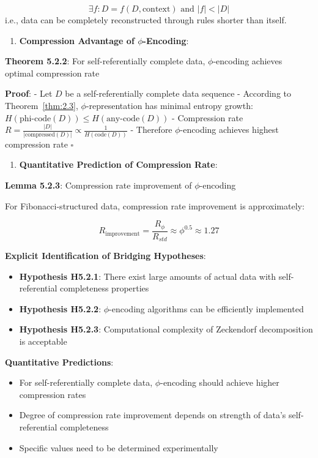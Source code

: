 \begin{equation}
\exists f: D = f(D, \text{context}) \text{ and } |f| < |D|
\end{equation}
   i.e., data can be completely reconstructed through rules shorter than itself.

\begin{enumerate}
\item \textbf{Compression Advantage of $\phi$-Encoding}:
\end{enumerate}
   \textbf{Theorem 5.2.2}: For self-referentially complete data, $\phi$-encoding achieves optimal compression rate
\label{thm:5.2.2}
   
   \textbf{Proof}:
   - Let $D$ be a self-referentially complete data sequence
   - According to Theorem~\ref{thm:2.3}, $\phi$-representation has minimal entropy growth: $H(\text{phi-code}(D)) \leq H(\text{any-code}(D))$
   - Compression rate $R = \frac{|D|}{|\text{compressed}(D)|} \propto \frac{1}{H(\text{code}(D))}$
   - Therefore $\phi$-encoding achieves highest compression rate $\square$

\begin{enumerate}
\item \textbf{Quantitative Prediction of Compression Rate}:
\end{enumerate}
   \textbf{Lemma 5.2.3}: Compression rate improvement of $\phi$-encoding
\label{lemma:5.2.3}
   
   For Fibonacci-structured data, compression rate improvement is approximately:
   
\begin{equation}
R_{\text{improvement}} = \frac{R_\phi}{R_{std}} \approx \phi^{0.5} \approx 1.27
\end{equation}

\textbf{Explicit Identification of Bridging Hypotheses}:
\begin{itemize}
\item \textbf{Hypothesis H5.2.1}: There exist large amounts of actual data with self-referential completeness properties
\item \textbf{Hypothesis H5.2.2}: $\phi$-encoding algorithms can be efficiently implemented
\item \textbf{Hypothesis H5.2.3}: Computational complexity of Zeckendorf decomposition is acceptable
\end{itemize}

\textbf{Quantitative Predictions}:
\begin{itemize}
\item For self-referentially complete data, $\phi$-encoding should achieve higher compression rates
\item Degree of compression rate improvement depends on strength of data's self-referential completeness
\item Specific values need to be determined experimentally
\end{itemize}

